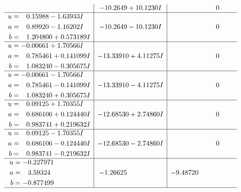 \documentclass[1p]{elsarticle_modified}
\theoremstyle{definition}
\begin{document}
$$\begin{array}{c|c|c}
 & -10.2649 + 10.1230 I & \phantom{-0.000000 } 0 \\ \hline\begin{aligned}
u &= \phantom{-}0.15988 - 1.63933 I \\
a &= \phantom{-}0.89920 - 1.16202 I \\
b &= \phantom{-}1.204800 + 0.573189 I\end{aligned}
 & -10.2649 - 10.1230 I & \phantom{-0.000000 } 0 \\ \hline\begin{aligned}
u &= -0.00661 + 1.70566 I \\
a &= \phantom{-}0.785461 + 0.141099 I \\
b &= \phantom{-}1.083240 - 0.305675 I\end{aligned}
 & -13.33910 + 4.11275 I & \phantom{-0.000000 } 0 \\ \hline\begin{aligned}
u &= -0.00661 - 1.70566 I \\
a &= \phantom{-}0.785461 - 0.141099 I \\
b &= \phantom{-}1.083240 + 0.305675 I\end{aligned}
 & -13.33910 - 4.11275 I & \phantom{-0.000000 } 0 \\ \hline\begin{aligned}
u &= \phantom{-}0.09125 + 1.70355 I \\
a &= \phantom{-}0.686106 + 0.124440 I \\
b &= \phantom{-}0.983741 + 0.219632 I\end{aligned}
 & -12.68530 + 2.74860 I & \phantom{-0.000000 } 0 \\ \hline\begin{aligned}
u &= \phantom{-}0.09125 - 1.70355 I \\
a &= \phantom{-}0.686106 - 0.124440 I \\
b &= \phantom{-}0.983741 - 0.219632 I\end{aligned}
 & -12.68530 - 2.74860 I & \phantom{-0.000000 } 0 \\ \hline\begin{aligned}
u &= -0.227971\phantom{ +0.000000I} \\
a &= \phantom{-}3.59324\phantom{ +0.000000I} \\
b &= -0.877499\phantom{ +0.000000I}\end{aligned}
 & -1.26625\phantom{ +0.000000I} & -9.48720\phantom{ +0.000000I}\\
 \hline 
 \end{array}$$\newpage\newpage\renewcommand{\arraystretch}{1}
\end{document}

